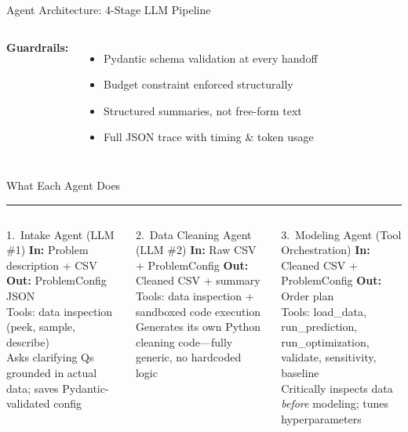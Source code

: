 \documentclass[aspectratio=169, 9pt]{beamer}
\newcommand{\goldrule}{\textcolor{PurdueGold}{\rule{\linewidth}{1.2pt}}}
\begin{document}
\begin{frame}{Agent Architecture: 4-Stage LLM Pipeline}
\begin{columns}[T]
{\small\textbf{\color{AgedGold}Guardrails:}}
\begin{itemize}\scriptsize
  \item Pydantic schema validation at every handoff
  \item Budget constraint enforced structurally
  \item Structured summaries, not free-form text
  \item Full JSON trace with timing \& token usage
\end{itemize}
\end{columns}
\end{frame}

\begin{frame}{What Each Agent Does}
\goldrule
\vspace{1pt}
\begin{columns}[T]
\begin{block}{1.\ Intake Agent {\tiny\color{CoolGray}(LLM \#1)}}
\scriptsize
\textbf{In:} Problem description + CSV \quad \textbf{Out:} ProblemConfig JSON\\
Tools: data inspection (peek, sample, describe)\\
Asks clarifying Qs grounded in actual data; saves Pydantic-validated config
\end{block}

\vspace{2pt}
\begin{block}{2.\ Data Cleaning Agent {\tiny\color{CoolGray}(LLM \#2)}}
\scriptsize
\textbf{In:} Raw CSV + ProblemConfig \quad \textbf{Out:} Cleaned CSV + summary\\
Tools: data inspection + sandboxed code execution\\
Generates its own Python cleaning code---fully generic, no hardcoded logic
\end{block}

\begin{block}{3.\ Modeling Agent {\tiny\color{CoolGray}(Tool Orchestration)}}
\scriptsize
\textbf{In:} Cleaned CSV + ProblemConfig \quad \textbf{Out:} Order plan\\
Tools: load\_data, run\_prediction, run\_optimization, validate, sensitivity, baseline\\
Critically inspects data \emph{before} modeling; tunes hyperparameters
\end{block}


\end{columns}
\end{frame}
\end{document}
